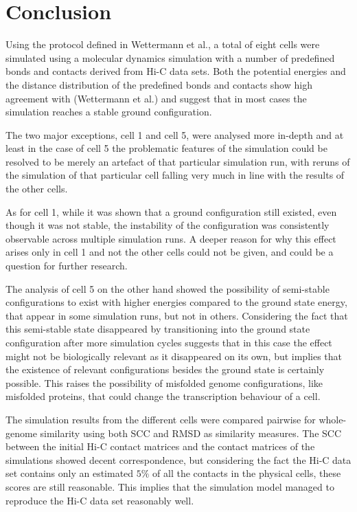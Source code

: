 
\chapter{Conclusion} %
\label{cha:conclusion}

Using the protocol defined in Wettermann et al.\cite{wettermann_minimal_2020}, a total of eight cells were simulated using a molecular dynamics simulation with a number of predefined bonds and contacts derived from Hi-C data sets. Both the potential energies and the distance distribution of the predefined bonds and contacts show high agreement with (Wettermann et al.\cite{wettermann_minimal_2020}) and suggest that in most cases the simulation reaches a stable ground configuration.

The two major exceptions, cell 1 and cell 5, were analysed more in-depth and at least in the case of cell 5 the problematic features of the simulation could be resolved to be merely an artefact of that particular simulation run, with reruns of the simulation of that particular cell falling very much in line with the results of the other cells.

As for cell 1, while it was shown that a ground configuration still existed, even though it was not stable, the instability of the configuration was consistently observable across multiple simulation runs. A deeper reason for why this effect arises only in cell 1 and not the other cells could not be given, and could be a question for further research.

The analysis of cell 5 on the other hand showed the possibility of semi-stable configurations to exist with higher energies compared to the ground state energy, that appear in some simulation runs, but not in others. Considering the fact that this semi-stable state disappeared by transitioning into the ground state configuration after more simulation cycles suggests that in this case the effect might not be biologically relevant as it disappeared on its own, but implies that the existence of relevant configurations besides the ground state is certainly possible. This raises the possibility of misfolded genome configurations, like misfolded proteins, that could change the transcription behaviour of a cell.

The simulation results from the different cells were compared pairwise for whole-genome similarity using both SCC and RMSD as similarity measures. The SCC between the initial Hi-C contact matrices and the contact matrices of the simulations showed decent correspondence, but considering the fact the Hi-C data set contains only an estimated \(5\%\) of all the contacts in the physical cells, these scores are still reasonable. This implies that the simulation model managed to reproduce the Hi-C data set reasonably well.

